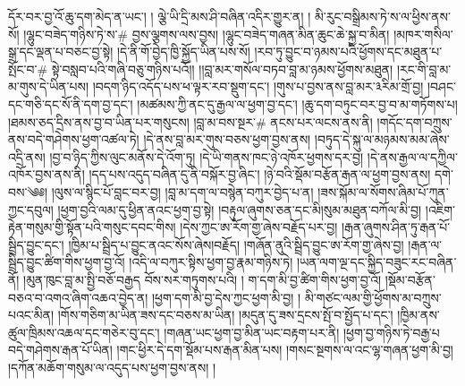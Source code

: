 དོར་བར་བྱ་འོ་ཆུ་དག་མེད་ན་ཡང་། ། ལྕེ་ཡི་དྲི་མས་ཤི་བཞིན་འདིར་གྱུར་ན། ། མི་རུང་བསྒྲིམས་ཏེ་ས་ལ་ཕྱིས་ནས་སོ། །ལྷུང་བཟེད་གཉིས་ཏེ་ས་# བྱས་ལྕགས་ལས་བྱས། །ལྷུང་བཟེད་གཞན་མིན་ཆུང་ཆེ་སྐྱ་བ་མིན། །མཁར་གསིལ་སྒྲ་དང་ལྡན་པ་བཅང་བྱ་སྟེ། །དེ་ནི་གོ་བྱེད་ཁྱི་སྐྱོད་ཡིན་པས་སོ། །རབ་ཏུ་བྱུང་བ་ཉམས་པའི་ཕྱོགས་དང་མཐུན་པ་སྤོང་བ་# སྟེ་བསླབ་པའི་གཞི་བཅུ་གཉིས་པའོ།། །།བླ་མར་གསོལ་བཏབ་བླ་མ་ཉམས་ཕྱོགས་མཐུན། །རང་གི་བླ་མ་མ་གུས་དེ་ཡིན་པས། །བདག་ཉིད་འདོད་པས་ཕ་ལྟར་རབ་སྡུག་དང་། །གུས་པ་བྱས་ནས་བླ་མར་༣རིམ་གྲོ་བྱ། །བཤང་དང་གཅི་དང་སོ་ནི་དག་བྱ་དང་། །མཚམས་ཀྱི་ནང་དུ་རྒྱལ་ལ་ཕྱག་བྱ་དང་། །ཆུ་དག་བཏུང་བར་བྱ་བ་མ་གཏོགས་པ། །ཐམས་ཅད་དྲིས་ནས་བྱ་བ་ཡིན་པར་གསུངས། །བླ་མ་བས་སྔར་# ནངས་པར་ལངས་ནས་ནི། །གདོང་དག་བཀྲུས་ནས་བདེ་གཤེགས་ཕྱག་འཚལ་ཏེ། །དེ་ནས་བླ་མར་གུས་བཅས་ཕྱག་བྱས་ནས། །བཏུད་དེ་སྐུ་ལ་མཉམས་མམ་ཞེས་འདྲི་ནས། །བྱ་བ་ཉིད་ཀྱིས་ལུང་མནོས་དེ་འོག་ཏུ། །དེ་ཡི་གནས་ཁང་ཉེ་འཁོར་ཕྱགས་དར་བྱ། །དེ་ནས་རྒྱལ་ལ་དཀྱིལ་འཁོར་བྱས་ནས་ནི། །དད་པས་འདུད་བཞིན་དུ་ནི་བསྐོར་བྱ་ཞིང་། །ཉེ་བའི་སྡོམ་བརྩོན་རྒན་ལ་ཕྱག་བྱས་ནས། དགེ་བས་༄༅། །ལུས་ལ་སྙིང་པོ་བླང་བར་བྱ། །བླ་མ་དག་ལ་བསྙེན་བཀུར་བྱེད་པ་ན། །ཟས་སྐོམ་ལ་སོགས་ཞིམ་པོ་ཀུན་ཀྱང་དབུལ། །ཕྱག་བྱའི་ལམ་དུ་ཕྱིན་ནའང་ཕྱག་བྱ་སྟེ། །བརྟུལ་ཞུགས་ཅན་དང་མི།སུམ་མཐུན་བཀོལ་མི་བྱ། །འཇིག་རྟེན་གསུམ་གྱི་སྟོན་པའི་གསུང་དབང་གིས། །དེས་ཀྱང་ཨ་རོག་གྱ་ཞེས་བརྗོད་པར་བྱ། །རྒན་ཞུགས་ཤིན་ཏུ་རྒན་པོ་སྦྲིད་བྱུང་དང་། །ཁྱིམ་པ་སྦྲིད་པ་བྱུང་ནའང་སོས་ཞེས།བརྗོད། །གཞོན་ནུའི་སྦྲིད་བྱུང་ཨ་རོག་གྱ་ཞེས་བྱ། །རྒན་ལ་སྦྲིད་བྱུང་ཚིག་གིས་ཕྱག་བྱ་འོ། །འདི་ལ་བཀུར་སྟིས་ཕྱག་བྱ་རྣམ་གཉིས་ཏེ། །ཡན་ལག་ལྔ་དང་སྐྱིད་བཟུང་རང་བཞིན་ནོ། །མུན་ཁུང་བླ་མ་སྤྱི་བཅོ་བརྒྱད བོས་སར་གཏུགས་པའི། ། ག་དག་མི་བྱ་ཚིག་གིས་ཕྱག་བྱ་འོ། །སྡོམ་བརྩོན་བཅའ་བ་འགའ་ཞིག་འཆའ་བྱེད་ན། །ཕྱག་དག་མི་བྱ་དེས་ཀྱང་ཕྱག་མི་བྱ། ། མི་གཙང་ལམ་གྱི་ཕྱོགས་མ་བཀྲུས་པའང་མིན། །གོས་གཅིག་མ་ཡིན་ཟས་དང་བཅས་མ་ཡིན། །མདུན་དུ་ཟས་དྲངས་སྤོ་བ་སྤྱོད་པ་དང་། །ཁྱིམ་ནས་ཚུལ་ཁྲིམས་འཆལ་དང་གཅེར་བུ་དང་། །གཞན་ཡང་ཕྱག་བྱ་མིན་ཡང་བརྟག་པར་ནི། །ཕྱག་བྱ་གཉིས་ཏེ་བརྒྱ་པ བདེ་གཤེགས་རྒན་པོ་ཡིན། །གང་ཕྱིར་དེ་དག་སྡོམ་པས་རྒན་མིན་པས། །གསང་སྔགས་ལ་འང་ལྷ་གཞན་ཕྱག་མི་བྱ། །དཀོན་མཆོག་གསུམ་ལ་འདུད་པས་ཕྱག་བྱས་ནས། །
